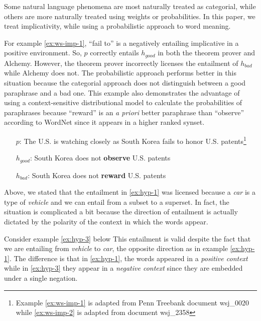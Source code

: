 Some natural language phenomena are most naturally treated as categorial, while
others are more naturally treated using weights or probabilities. In this paper,
we treat implicativity, while using a probabilistic approach to word meaning.



For example \eqref{ex:ws-imp-1}, ``fail to'' is a negatively entailing
implicative in a positive environment.
So, $p$ correctly entails $h_{good}$ in both the theorem prover and Alchemy. 
However, the theorem prover incorrectly licenses the entailment of $h_{bad}$
while Alchemy does not.  
The probabilistic approach performs better in this situation because the
categorial approach does not distinguish between a good paraphrase and a
bad one.  This example also demonstrates the advantage of using a
context-sensitive distributional model to calculate the probabilities of
paraphrases because ``reward'' is an {\it a priori} better paraphrase than
``observe'' according to WordNet since it appears in a higher ranked synset. 

\begin{covex}\label{ex:ws-imp-1}
\begin{itemize}
  \item[$p$:] The U.S. is watching closely as South Korea fails to honor
  U.S. patents\footnote{Example \eqref{ex:ws-imp-1} is adapted from Penn
  Treebank document wsj\_0020 while \eqref{ex:ws-imp-2} is adapted from document
  wsj\_2358}
  \item[$h_{good}$:] South Korea does not {\bf observe} U.S. patents
  \item[$h_{bad}$:] South Korea does not {\bf reward} U.S. patents
\end{itemize}
\end{covex}




Above, we stated that the entailment in \eqref{ex:hyp-1} was licensed because a
{\it car} is a type of {\it vehicle} and we can entail from a subset to a
superset.  In fact, the situation is complicated a bit because the direction of
entailment is actually dictated by the polarity of the context in which the
words appear.

Consider example \eqref{ex:hyp-3} below
This entailment is valid despite the fact that we are entailing from {\it
vehicle} to {\it car}, the opposite direction as in example \eqref{ex:hyp-1}. 
The difference is that in \eqref{ex:hyp-1}, the words appeared in a {\it
positive context} while in \eqref{ex:hyp-3} they appear in a {\it
negative context} since they are embedded under a single negation.

